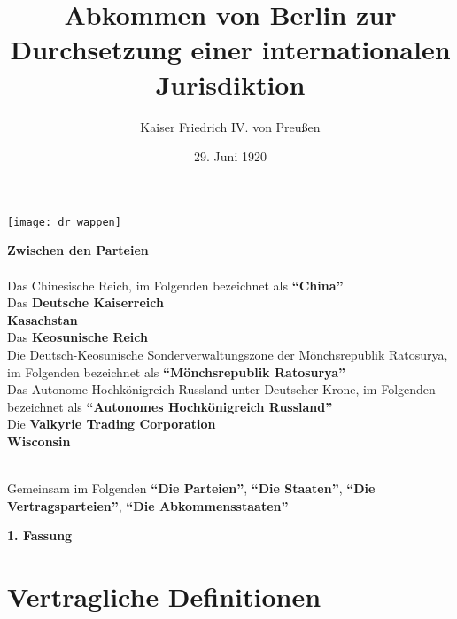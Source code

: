 \documentclass{article}
\title{Abkommen von Berlin zur Durchsetzung einer internationalen Jurisdiktion}
\author{Kaiser Friedrich IV. von Preußen}
\date{29. Juni 1920}
\begin{document}
\maketitle
\begin{center}
    \texttt{[image: dr\_wappen]}
\end{center}
\begin{center}
    \textbf{Zwischen den Parteien\\}\textbf{\\}
    Das Chinesische Reich, im Folgenden bezeichnet als \textbf{``China''\\}
    Das \textbf{Deutsche Kaiserreich\\}
    \textbf{Kasachstan\\}
    Das \textbf{Keosunische Reich\\}
    Die Deutsch-Keosunische Sonderverwaltungszone der Mönchsrepublik Ratosurya, im Folgenden bezeichnet als \textbf{``Mönchsrepublik Ratosurya''\\}
    Das Autonome Hochkönigreich Russland unter Deutscher Krone, im Folgenden bezeichnet als \textbf{``Autonomes Hochkönigreich Russland''\\}
    Die \textbf{Valkyrie Trading Corporation\\}
    \textbf{Wisconsin\\}\textbf{\\}

    Gemeinsam im Folgenden \textbf{``Die Parteien''}, \textbf{``Die Staaten''}, \textbf{``Die Vertragsparteien''}, \textbf{``Die Abkommensstaaten''}
\end{center}
\newpage
{}
\vspace*{\fill}
\begin{Center}
\textbf{1. Fassung}
\vspace*{\fill}
\end{Center}
\newpage
\tableofcontents
\newpage
\section{Vertragliche Definitionen}
\end{document}

